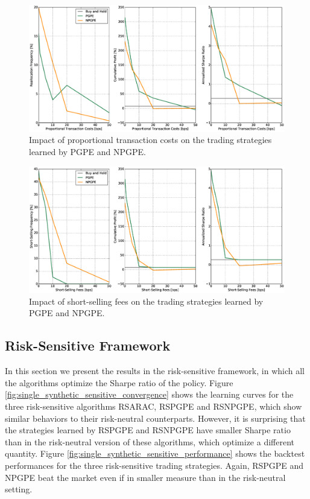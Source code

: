 \begin{figure}[t!]
	\centering
	\includegraphics[width=1.0\textwidth]{Images/6_2_impact_transaction_costs}
	\caption[Impact of proportional transaction costs]{Impact of proportional transaction costs on the trading strategies learned by PGPE and NPGPE.}
	\label{fig:impact_transaction_costs}
\end{figure}

\begin{figure}[t!]
	\centering
	\includegraphics[width=1.0\textwidth]{Images/6_3_impact_short_selling_fees}
	\caption[Impact of short-selling fees]{Impact of short-selling fees on the trading strategies learned by PGPE and NPGPE.}
	\label{fig:impact_short_selling_fees}
\end{figure}

\subsection{Risk-Sensitive Framework}
In this section we present the results in the risk-sensitive framework, in which all the algorithms optimize the Sharpe ratio of the policy. Figure \ref{fig:single_synthetic_sensitive_convergence} shows the learning curves for the three risk-sensitive algorithms RSARAC, RSPGPE and RSNPGPE, which show similar behaviors to their risk-neutral counterparts. However, it is surprising that the strategies learned by RSPGPE and RSNPGPE have smaller Sharpe ratio than in the risk-neutral version of these algorithms, which optimize a different quantity. Figure \ref{fig:single_synthetic_sensitive_performance} shows the backtest performances for the three risk-sensitive trading strategies. Again, RSPGPE and NPGPE beat the market even if in smaller measure than in the risk-neutral setting. 

